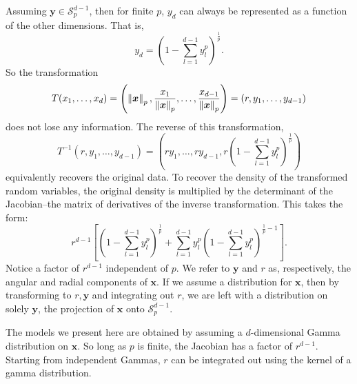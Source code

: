Assuming $\bm{y} \in \mathcal{S}_{p}^{d-1}$, then for finite $p$, $y_d$ can always be represented
  as a function of the other dimensions.  That is,
  \begin{equation*}
    y_d = \left(1 - \sum_{l = 1}^{d-1}y_l^p\right)^{\frac{1}{p}}.
  \end{equation*}
  So the transformation
  \begin{equation}
    \label{eqn:pnormt}
    T(x_1,\ldots,x_d) = \left(\left\lVert \bm{x} \right\rVert_{p}, \frac{x_1}{\left\lVert \bm{x} \right\rVert_{p}},
                          \ldots , \frac{x_{d-1}}{\left\lVert \bm{x} \right\rVert_{p}}\right) = (r,y_1,\ldots,y_{d-1})
  \end{equation}
  does not lose any information.  The reverse of this transformation,
  \begin{equation}
    \label{eqn:pnormtinv}
    T^{-1}\left(r,y_1,\ldots,y_{d-1}\right) =
      \left(ry_1,\ldots,ry_{d-1}, r\left(1 - {\scriptstyle\sum}_{l = 1}^{d-1}y_l^p\right)^{\frac{1}{p}}\right)
  \end{equation}
  equivalently recovers the original data.  To recover the density of the transformed random variables,
  the original density is multiplied by the determinant of the Jacobian--the matrix of derivatives
  of the inverse transformation.  This takes the form:
  \begin{equation}
    \label{eqn:pnormjac}
    r^{d-1}\left[\left(1 - \sum_{l = 1}^{d-1}y_l^p\right)^{\frac{1}{p}} +
        \sum_{l = 1}^{d-1}y_l^p\left(1 - \sum_{l=1}^{d-1} y_l^p\right)^{\frac{1}{p} - 1}\right].
  \end{equation}
  Notice a factor of $r^{d-1}$ independent of $p$. We refer to $\bm{y}$ and $r$ as, respectively,
  the angular and radial components of $\bm{x}$.  If we assume a distribution for $\bm{x}$, then
  by transforming to $r, \bm{y}$ and integrating out $r$, we are left with a distribution on solely
  $\bm{y}$, the projection of $\bm{x}$ onto $\mathcal{S}_{p}^{d-1}$.

The models we present here are obtained by assuming a $d$-dimensional Gamma distribution on $\bm{x}$.
  So long as $p$ is finite, the Jacobian has a factor of $r^{d-1}$.  Starting from independent Gammas,
  $r$ can be integrated out using the kernel of a gamma distribution.

